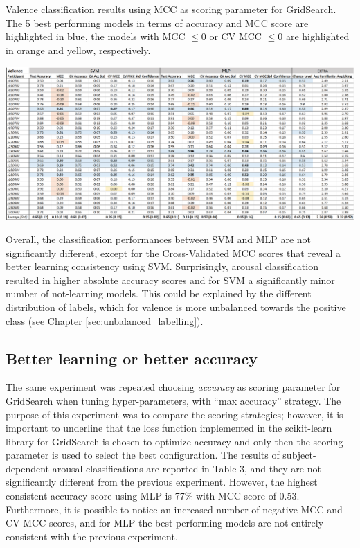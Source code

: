 \begin{table}[h!]
  \caption{Valence classification results using MCC as scoring parameter for GridSearch. The 5 best performing models in terms of accuracy and MCC score are highlighted in blue, the models with MCC \(\leq 0\) or CV MCC \(\leq 0\) are highlighted in orange and yellow, respectively.}
  \label{tbl:valence_results}
  \includegraphics[width=\linewidth]{img/results/valence_results.png}
\end{table}

Overall, the classification performances between \ac{SVM} and \ac{MLP} are not significantly different, except for the Cross-Validated MCC scores that reveal a better learning consistency using \ac{SVM}. Surprisingly, arousal classification resulted in higher absolute accuracy scores and for \ac{SVM} a significantly minor number of not-learning models. This could be explained by the different distribution of labels, which for valence is more unbalanced towards the positive class (see Chapter \ref{sec:unbalanced_labelling}).

\subsection{Better learning or better accuracy}
\label{sec:better_learning_accuracy}
The same experiment was repeated choosing \emph{accuracy} as scoring parameter for GridSearch when tuning hyper-parameters, with “max accuracy” strategy. The purpose of this experiment was to compare the scoring strategies; however, it is important to underline that the loss function implemented in the scikit-learn library for GridSearch is chosen to optimize accuracy and only then the scoring parameter is used to select the best configuration. The results of subject-dependent arousal classifications are reported in Table 3, and they are not significantly different from the previous experiment. However, the highest consistent accuracy score using MLP is 77\% with MCC score of 0.53. Furthermore, it is possible to notice an increased number of negative MCC and CV MCC scores, and for MLP the best performing models are not entirely consistent with the previous experiment.

